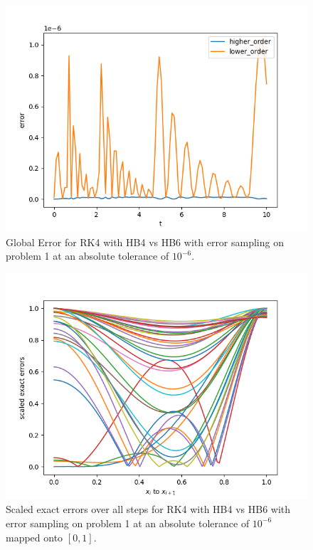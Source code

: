\begin{figure}[H]
\centering
\includegraphics[width=0.7\linewidth]{./figures/rk4_with_hb4_hb6_sampling_p1_global_error}
\caption{Global Error for RK4 with HB4 vs HB6 with error sampling on problem 1 at an absolute tolerance of $10^{-6}$.}
\label{fig:rk4_with_hb4_hb6_sampling_p1_global_error}
\end{figure}

\begin{figure}[H]
\centering
\includegraphics[width=0.7\linewidth]{./figures/rk4_with_hb4_hb6_sampling_p1_scaled_errors}
\caption{Scaled exact errors over all steps for RK4 with HB4 vs HB6 with error sampling on problem 1 at an absolute tolerance of $10^{-6}$ mapped onto $[0, 1]$.}
\label{fig:rk4_with_hb4_hb6_sampling_p1_scaled_errors}
\end{figure}

